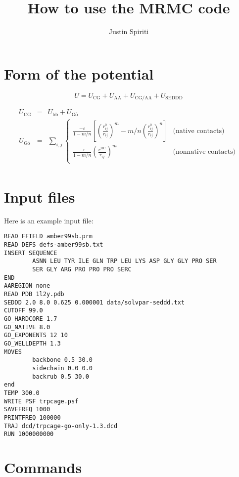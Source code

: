 \documentclass{article}      %
\title{How to use the MRMC code}  %
\author{Justin Spiriti}      %
\begin{document}

\maketitle                   %

\section{Form of the potential}

\begin{equation}
U = U_\mathrm{CG} + U_\mathrm{AA} + U_\mathrm{CG/AA} + U_\mathrm{SEDDD}
\end{equation}

\begin{eqnarray}
U_\mathrm{CG} &=& U_\mathrm{bb} + U_\mathrm{G\overline{o}} \\
U_\mathrm{G\overline{o}} &=& \sum_{i,j} \left\{ 
\begin{array}{ll}
\frac{-\varepsilon}{1-m/n} \left[\left(\frac{r^0_{ij}}{r_{ij}}\right)^{m}-m/n\left(\frac{r^0_{ij}}{r_{ij}}\right)^{n}\right] & \textrm{(native contacts)} \\
\frac{-\varepsilon}{1-m/n} \left(\frac{r^\mathrm{HC}}{r_{ij}}\right)^{m}& \textrm{(nonnative contacts)} \\
\end{array}
\right. \\ 
\end{eqnarray}

\section{Input files}
Here is an example input file:
\begin{verbatim}
READ FFIELD amber99sb.prm
READ DEFS defs-amber99sb.txt
INSERT SEQUENCE
        ASNN LEU TYR ILE GLN TRP LEU LYS ASP GLY GLY PRO SER
        SER GLY ARG PRO PRO PRO SERC
END
AAREGION none
READ PDB 1l2y.pdb
SEDDD 2.0 8.0 0.625 0.000001 data/solvpar-seddd.txt
CUTOFF 99.0
GO_HARDCORE 1.7
GO_NATIVE 8.0
GO_EXPONENTS 12 10
GO_WELLDEPTH 1.3
MOVES
        backbone 0.5 30.0
        sidechain 0.0 0.0
        backrub 0.5 30.0
end
TEMP 300.0
WRITE PSF trpcage.psf
SAVEFREQ 1000
PRINTFREQ 100000
TRAJ dcd/trpcage-go-only-1.3.dcd
RUN 1000000000
\end{verbatim}

\section{Commands}
\end{document}
